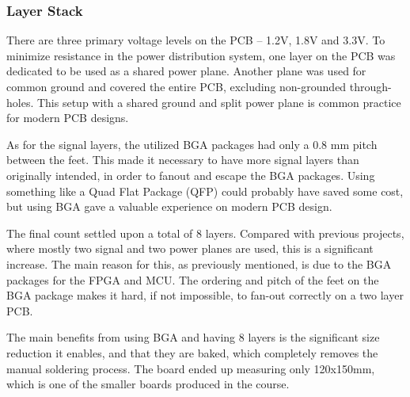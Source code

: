 \subsubsection{Layer Stack}

There are three primary voltage levels on the PCB -- 1.2V, 1.8V and 3.3V. To
minimize resistance in the power distribution system, one layer on the PCB was dedicated
to be used as a shared power plane. Another plane was used for
common ground and covered the entire PCB, excluding non-grounded through-holes.
This setup with a shared ground and split power plane is common practice for
modern PCB designs.

As for the signal layers, the utilized BGA packages had only a 0.8 mm pitch between
the feet. This made it necessary to have more signal layers than originally intended,
in order to fanout and escape the BGA packages. Using something like a Quad Flat Package (QFP)
could probably have saved some cost, but using BGA gave a valuable
experience on modern PCB design.

The final count settled upon a total of 8 layers. Compared with previous projects,
where mostly two signal and two power planes are used, this is a significant increase.
The main reason for this, as previously mentioned, is due to the
BGA packages for the FPGA and MCU. The ordering and pitch of the
feet on the BGA package makes it hard, if not impossible, to fan-out correctly on a
two layer PCB.

The main benefits from using BGA and having 8 layers is the significant size reduction it enables, and that they are baked, which completely removes the manual soldering process. The board ended up measuring only
120x150mm, which is one of the smaller boards produced in the course.
